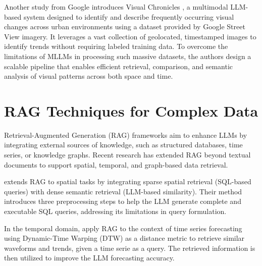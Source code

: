 Another study from Google introduces Visual Chronicles \cite{Deng2025VisualChronicles}, a multimodal LLM-based system designed to identify and describe frequently occurring visual changes across urban environments using a dataset provided by Google Street View imagery. It leverages a vast collection of geolocated, timestamped images to identify trends without requiring labeled training data. To overcome the limitations of MLLMs in processing such massive datasets, the authors design a scalable pipeline that enables efficient retrieval, comparison, and semantic analysis of visual patterns across both space and time.




\section{RAG Techniques for Complex Data}

Retrieval-Augmented Generation (RAG) frameworks aim to enhance LLMs by integrating external sources of knowledge, such as structured databases, time series, or knowledge graphs. Recent research has extended RAG beyond textual documents to support spatial, temporal, and graph-based data retrieval.

\cite{Yu2025SpatialRAG} extends RAG to spatial tasks by integrating sparse spatial retrieval (SQL-based queries) with dense semantic retrieval (LLM-based similarity). Their method introduces three preprocessing steps to help the LLM generate complete and executable SQL queries, addressing its limitations in query formulation.

In the temporal domain, \cite{Yang2024TimeRAG} apply RAG to the context of time series forecasting using Dynamic-Time Warping (DTW) as a distance metric to retrieve similar waveforms and trends, given a time serie as a query. The retrieved information is then utilized to improve the LLM forecasting accuracy. 

